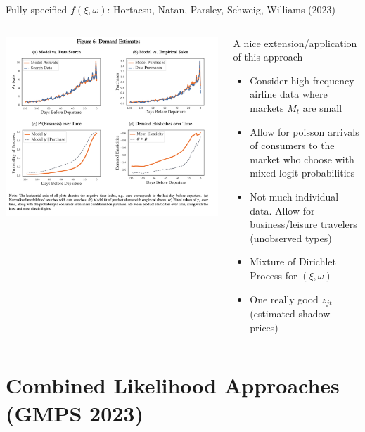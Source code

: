 \documentclass[aspectratio=169,10pt]{beamer}
\begin{document}
\begin{frame}{Fully specified $f(\xi,\omega)$: Hortacsu, Natan, Parsley, Schweig, Williams (2023)}

\begin{columns}
\begin{column}{0.5\textwidth}
     \includegraphics[width=\textwidth]{resources/williams_2023}      
\end{column}
\begin{column}{0.5\textwidth}
A nice extension/application of this approach
\begin{itemize}
    \item Consider high-frequency airline data where markets $M_t$ are \alert{small}
    \item Allow for poisson arrivals of consumers to the market who choose with mixed logit probabilities
    \item Not much individual data. Allow for business/leisure travelers (unobserved types)
    \item Mixture of Dirichlet Process for $(\xi, \omega)$
    \item One really good $z_{jt}$ (estimated shadow prices)
\end{itemize}
\end{column}
\end{columns}


\end{frame}

\section*{Combined Likelihood Approaches (GMPS 2023)}
\end{document}
